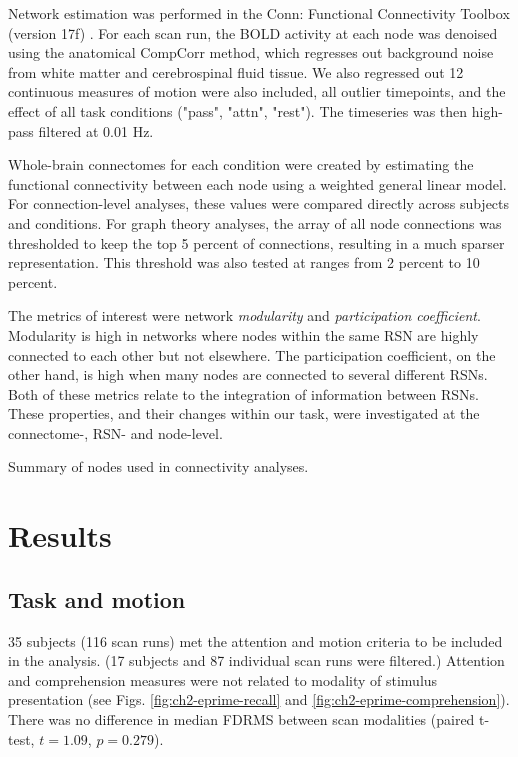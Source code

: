 Network estimation was performed in the Conn: Functional Connectivity Toolbox (version 17f) \cite{Nieto-castanon}. For each scan run, the BOLD activity at each node was denoised using the anatomical CompCorr method, which regresses out background noise from white matter and cerebrospinal fluid tissue. We also regressed out 12 continuous measures of motion were also included, all outlier timepoints, and the effect of all task conditions ("pass", "attn", "rest"). The timeseries was then high-pass filtered at 0.01 Hz.

Whole-brain connectomes for each condition were created by estimating the functional connectivity between each node using a weighted general linear model. For connection-level analyses, these values were compared directly across subjects and conditions. For graph theory analyses, the array of all node connections was thresholded to keep the top 5 percent of connections, resulting in a much sparser representation. This threshold was also tested at ranges from 2 percent to 10 percent.

The metrics of interest were network \textit{modularity} and \textit{participation coefficient}. Modularity is high in networks where nodes within the same RSN are highly connected to each other but not elsewhere. The participation coefficient, on the other hand, is high when many nodes are connected to several different RSNs. Both of these metrics relate to the integration of information between RSNs. These properties, and their changes within our task, were investigated at the connectome-, RSN- and node-level. 

\begin{table}
	\scriptsize
	\renewcommand{\tabcolsep}{0.09cm}
	\centering
	
	\caption{Summary of nodes used in connectivity analyses.}
	\label{table:ch2-power-nodes}
\end{table}

\section{Results}

\subsection{Task and motion}

35 subjects (116 scan runs) met the attention and motion criteria to be included in the analysis. (17 subjects and 87 individual scan runs were filtered.) Attention and comprehension measures were not related to modality of stimulus presentation (see Figs. \ref{fig:ch2-eprime-recall} and \ref{fig:ch2-eprime-comprehension}). There was no difference in median FDRMS between scan modalities (paired t-test, $t = 1.09$, $p = 0.279$).  

